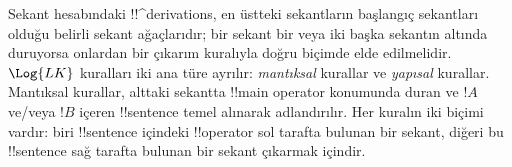 Sekant hesabındaki !!^{derivation}s, en üstteki sekantların başlangıç
sekantları olduğu belirli sekant ağaçlarıdır; bir sekant bir veya iki başka
sekantın altında duruyorsa onlardan bir çıkarım kuralıyla doğru biçimde elde
edilmelidir. $\Log{LK}$ kuralları iki ana türe ayrılır: \emph{mantıksal}
kurallar ve \emph{yapısal} kurallar. Mantıksal kurallar, alttaki sekantta
!!{main operator} konumunda duran ve $!A$ ve/veya $!B$ içeren
!!{sentence} temel alınarak adlandırılır. Her kuralın iki biçimi vardır: biri
!!{sentence} içindeki !!{operator} sol tarafta bulunan bir sekant, diğeri bu !!{sentence}
sağ tarafta bulunan bir sekant çıkarmak içindir.

